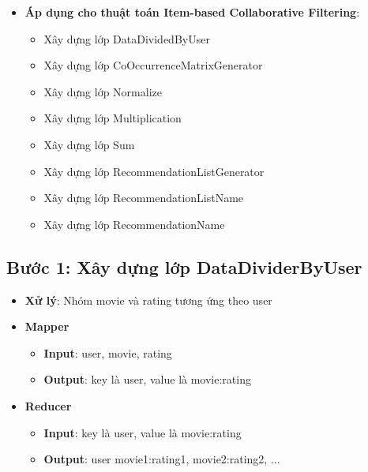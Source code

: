 \begin{itemize}
\begin{itemize}
          \end{itemize}
    \item \textbf{Áp dụng cho thuật toán Item-based Collaborative Filtering}:
          \begin{itemize}
              \item Xây dựng lớp DataDividedByUser
              \item Xây dựng lớp CoOccurrenceMatrixGenerator
              \item Xây dựng lớp Normalize
              \item Xây dựng lớp Multiplication
              \item Xây dựng lớp Sum
              \item Xây dựng lớp RecommendationListGenerator
              \item Xây dựng lớp RecommendationListName
              \item Xây dựng lớp RecommendationName
          \end{itemize}
\end{itemize}

\subsection*{Bước 1: Xây dựng lớp DataDividerByUser}
\begin{itemize}
    \item \textbf{Xử lý}: Nhóm movie và rating tương ứng theo user \\
    \item \textbf{Mapper}
          \begin{itemize}
              \item \textbf{Input}: user, movie, rating \\
              \item \textbf{Output}: key là user, value là movie:rating \\
          \end{itemize}
    \item \textbf{Reducer}
          \begin{itemize}
              \item \textbf{Input}: key là user, value là movie:rating \\
              \item \textbf{Output}: user \quad movie1:rating1, movie2:rating2, ... \\
          \end{itemize}
\end{itemize}
